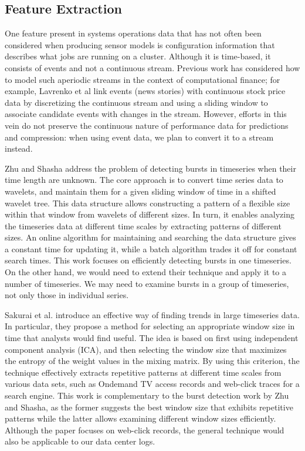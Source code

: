 \subsection{Feature Extraction}
One feature present in systems operations data that has not often been considered when producing sensor models is configuration information that describes what jobs are running on a cluster. Although it is time-based, it consists of events and not a continuous stream. Previous work has considered how to model such aperiodic streams in the context of computational finance; for example, Lavrenko et al \cite{Lavrenko2000} link events (news stories) with continuous stock price data by discretizing the continuous stream and using a sliding window to associate candidate events with changes in the stream. However, efforts in this vein do not preserve the continuous nature of performance data for predictions and compression: when using event data, we plan to convert it to a stream instead.

Zhu and Shasha \cite{Zhu2003} address the problem of detecting bursts in timeseries when their time length are unknown. The core approach is to convert time series data to wavelets, and maintain them  for a given sliding window of time in a shifted wavelet tree. This data structure allows constructing a pattern of a flexible size within that window from wavelets of different sizes. In turn, it enables analyzing the timeseries data at different time scales by extracting patterns of different sizes. An online algorithm for maintaining and searching the data structure gives a constant time for updating it, while a batch algorithm trades it off for constant search times. This work focuses on efficiently detecting bursts in one timeseries. On the other hand, we would need to extend their technique and apply it to a number of timeseries. We may need to examine bursts in a group of timeseries, not only those in individual series.

Sakurai et al. \cite{Sakurai2011} introduce an effective way of finding trends in large timeseries data. In particular, they propose a method for selecting an appropriate window size in time that analysts would find useful. The idea is based on first using independent component analysis (ICA), and then selecting the window size that maximizes the entropy of the weight values in the mixing matrix. By using this criterion, the technique effectively extracts repetitive patterns at different time scales from various data sets, such as Ondemand TV access records and web-click traces for a search engine. This work is complementary to the burst detection work by Zhu and Shasha, as the former suggests the best window size that exhibits repetitive patterns while the latter allows examining different window sizes efficiently. Although the paper focuses on web-click records, the general technique would also be applicable to our data center logs.


